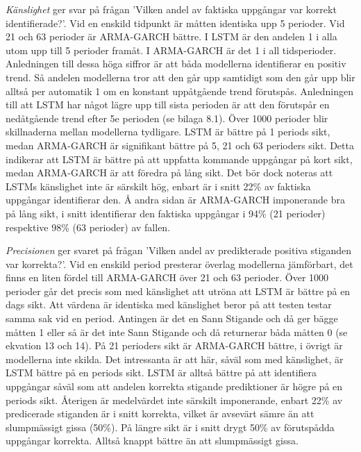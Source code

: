 \documentclass[12pt]{article}
\begin{document}
\par \textit{Känslighet} ger svar på frågan 'Vilken andel av faktiska uppgångar var korrekt identifierade?'. Vid en enskild tidpunkt är måtten identiska upp 5 perioder. Vid 21 och 63 perioder är ARMA-GARCH bättre. I LSTM är den andelen 1 i alla utom upp till 5 perioder framåt. I ARMA-GARCH är det 1 i all tidsperioder. Anledningen till dessa höga siffror är att båda modellerna identifierar en positiv trend. Så andelen modellerna tror att den går upp samtidigt som den går upp blir alltså per automatik 1 om en konstant uppåtgående trend förutspås. Anledningen till att LSTM har något lägre upp till sista perioden är att den förutspår en nedåtgående trend efter 5e perioden (se bilaga 8.1).  Över 1000 perioder blir skillnaderna mellan modellerna tydligare. LSTM är bättre på 1 periods sikt, medan ARMA-GARCH är signifikant bättre på 5, 21 och 63 perioders sikt. Detta indikerar att LSTM är bättre på att uppfatta kommande uppgångar på kort sikt, medan ARMA-GARCH är att föredra på lång sikt. Det bör dock noteras att LSTMs känslighet inte är särskilt hög, enbart är i snitt 22\% av faktiska uppgångar identifierar den. Å andra sidan är ARMA-GARCH imponerande bra på lång sikt, i snitt identifierar den faktiska uppgångar i 94\% (21 perioder) respektive 98\% (63 perioder) av fallen. 

\par\textit{Precisionen} ger svaret på frågan 'Vilken andel av predikterade positiva stiganden var korrekta?'. Vid en enskild period presterar överlag modellerna jämförbart, det finns en liten fördel till ARMA-GARCH över 21 och 63 perioder. Över 1000 perioder går det precis som med känslighet att utröna att LSTM är bättre på en dags sikt. Att värdena är identiska med känslighet beror på att testen testar samma sak vid en period. Antingen är det en Sann Stigande och då ger bägge måtten 1 eller så är det inte Sann Stigande och då returnerar båda måtten 0 (se ekvation 13 och 14). På 21 perioders sikt är ARMA-GARCH bättre, i övrigt är modellerna inte skilda. Det intressanta är att här, såväl som med känslighet, är LSTM bättre på en periods sikt. LSTM är alltså bättre på att identifiera uppgångar såväl som att andelen korrekta stigande prediktioner är högre på en periods sikt. Återigen är medelvärdet inte särskilt imponerande, enbart 22\% av predicerade stiganden är i snitt korrekta, vilket är avsevärt sämre än att slumpmässigt gissa (50\%). På längre sikt är i snitt drygt 50\% av förutspådda uppgångar korrekta. Alltså knappt bättre än att slumpmässigt gissa. 
\end{document}
